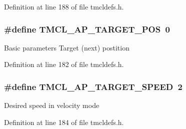 Definition at line 188 of file tmcldefs.h.\hypertarget{group__RWParam_ga87dfb3db656c898683ae4a5dd80e789a}{
\subsubsection[{TMCL\_\-AP\_\-TARGET\_\-POS}]{\setlength{\rightskip}{0pt plus 5cm}\#define TMCL\_\-AP\_\-TARGET\_\-POS~0}}
\label{group__RWParam_ga87dfb3db656c898683ae4a5dd80e789a}
Basic parameters Target (next) postition 

Definition at line 182 of file tmcldefs.h.\hypertarget{group__RWParam_ga9f34f155a65163069922f5f20c4c63b5}{
\subsubsection[{TMCL\_\-AP\_\-TARGET\_\-SPEED}]{\setlength{\rightskip}{0pt plus 5cm}\#define TMCL\_\-AP\_\-TARGET\_\-SPEED~2}}
\label{group__RWParam_ga9f34f155a65163069922f5f20c4c63b5}
Desired speed in velocity mode 

Definition at line 184 of file tmcldefs.h.